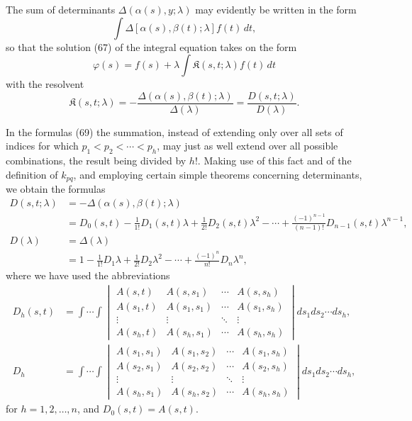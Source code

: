 The sum of determinants $\Delta(\alpha(s),y;\lambda)$ may evidently be written in the form
\[
\int \Delta[\alpha(s),\beta(t);\lambda]f(t)\,dt,
\]
so that the solution (67) of the integral equation takes on the form
\begin{equation}\tag{62'}
\varphi(s)=f(s)+\lambda\int \mathfrak{K}(s,t;\lambda)f(t)\,dt
\end{equation}
with the resolvent
\begin{equation}\tag{70}
\mathfrak{K}(s,t;\lambda)
=-\frac{\Delta(\alpha(s),\beta(t);\lambda)}{\Delta(\lambda)}
=\frac{D(s,t;\lambda)}{D(\lambda)}.
\end{equation}

In the formulas (69) the summation, instead of extending only over all sets of indices for which $p_1<p_2<\cdots<p_h$, may just as well extend over all possible combinations, the result being divided by $h!$. Making use of this fact and of the definition of $k_{pq}$, and employing certain simple theorems concerning determinants, we obtain the formulas
\begin{equation}\tag{71}
\begin{aligned}
D(s,t;\lambda)&=-\Delta(\alpha(s),\beta(t);\lambda)\\
&=D_0(s,t)-\frac{1}{1!}D_1(s,t)\lambda
+\frac{1}{2!}D_2(s,t)\lambda^2-\cdots
+\frac{(-1)^{n-1}}{(n-1)!}D_{n-1}(s,t)\lambda^{n-1},\\
D(\lambda)&=\Delta(\lambda)\\
&=1-\frac{1}{1!}D_1\lambda+\frac{1}{2!}D_2\lambda^2-\cdots
+\frac{(-1)^n}{n!}D_n\lambda^n,
\end{aligned}
\end{equation}
where we have used the abbreviations
\begin{equation}\tag{72}
\begin{aligned}
D_h(s,t)
&=\int\!\cdots\!\int
\begin{vmatrix}
A(s,t)&A(s,s_1)&\cdots&A(s,s_h)\\
A(s_1,t)&A(s_1,s_1)&\cdots&A(s_1,s_h)\\
\vdots&\vdots&\ddots&\vdots\\
A(s_h,t)&A(s_h,s_1)&\cdots&A(s_h,s_h)
\end{vmatrix}
 ds_1ds_2\cdots ds_h,\\[1ex]
D_h
&=\int\!\cdots\!\int
\begin{vmatrix}
A(s_1,s_1)&A(s_1,s_2)&\cdots&A(s_1,s_h)\\
A(s_2,s_1)&A(s_2,s_2)&\cdots&A(s_2,s_h)\\
\vdots&\vdots&\ddots&\vdots\\
A(s_h,s_1)&A(s_h,s_2)&\cdots&A(s_h,s_h)
\end{vmatrix}
 ds_1ds_2\cdots ds_h,
\end{aligned}
\end{equation}
for $h=1,2,\ldots,n$, and $D_0(s,t)=A(s,t)$.

